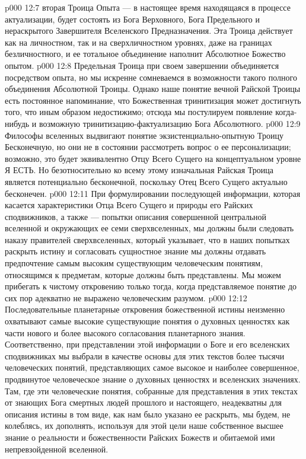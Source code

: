 \vs p000 12:7 \bibnobreakspace {} вторая Троица Опыта --- в настоящее время находящаяся в процессе актуализации, будет состоять из Бога Верховного, Бога Предельного и нераскрытого Завершителя Вселенского Предназначения. Эта Троица действует как на личностном, так и на сверхличностном уровнях, даже на границах безличностного, и ее тотальное объединение наполнит Абсолютное Божество опытом.
\vs p000 12:8 \pc Предельная Троица при своем завершении объединяется посредством опыта, но мы искренне сомневаемся в возможности такого полного объединения Абсолютной Троицы. Однако наше понятие вечной Райской Троицы есть постоянное напоминание, что Божественная тринитизация может достигнуть того, что иным образом недостижимо; отсюда мы постулируем появление когда\hyp{}нибудь  и возможную тринитизацию\hyp{}фактуализацию Бога Абсолютного.
\vs p000 12:9 \pc Философы вселенных выдвигают понятие  экзистенциально\hyp{}опытную Троицу Бесконечную, но они не в состоянии рассмотреть вопрос о ее персонализации; возможно, это будет эквивалентно Отцу Всего Сущего на концептуальном уровне Я ЕСТЬ. Но безотносительно ко всему этому изначальная Райская Троица является потенциально бесконечной, поскольку Отец Всего Сущего актуально бесконечен.
\vs p000 12:11 При формулировании последующей информации, которая касается характеристики Отца Всего Сущего и природы его Райских сподвижников, а также --- попытки описания совершенной центральной вселенной и окружающих ее семи сверхвселенных, мы должны были следовать наказу правителей сверхвселенных, который указывает, что в наших попытках раскрыть истину и согласовать сущностное знание мы должны отдавать предпочтение самым высоким существующим человеческим понятиям, относящимся к предметам, которые должны быть представлены. Мы можем прибегать к чистому откровению только тогда, когда представляемое понятие до сих пор адекватно не выражено человеческим разумом.
\vs p000 12:12 Последовательные планетарные откровения божественной истины неизменно охватывают самые высокие существующие понятия о духовных ценностях как части нового и более высокого согласования планетарного знания. Соответственно, при представлении этой информации о Боге и его вселенских сподвижниках мы выбрали в качестве основы для этих текстов более тысячи человеческих понятий, представляющих самое высокое и наиболее совершенное, продвинутое человеческое знание о духовных ценностях и вселенских значениях. Там, где эти человеческие понятия, собранные для представления в этих текстах от знающих Бога смертных людей прошлого и настоящего, неадекватны для описания истины в том виде, как нам было указано ее раскрыть, мы будем, не колеблясь, их дополнять, используя для этой цели наше собственное высшее знание о реальности и божественности Райских Божеств и обитаемой ими непревзойденной вселенной.

